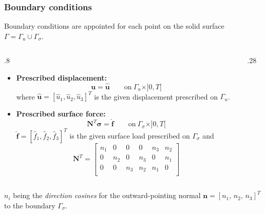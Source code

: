 \documentclass[aspectratio=169]{beamer}
\begin{document}
\begin{frame}
  \frametitle{Boundary conditions}
  \small Boundary conditions are appointed for each point on the solid surface $\Gamma=\Gamma_u\cup\Gamma_\sigma$.
  \vspace{-.2cm}
  \begin{columns}[T]
    \begin{column}{.8\textwidth}
      \small
      \begin{itemize}
        \item \textbf{Prescribed displacement:}
              $$\mathbf u=\mathbf{\hat u}\qquad \mbox{on}\  \Gamma_u\times]0,T[$$
              where $\mathbf{\hat u}=[\hat u_1, \hat u_2,\hat u_3]^T$ is the given displacement prescribed on $\Gamma_u$.
        \item \textbf{Prescribed surface force:}
              $$\mathbf N^T\boldsymbol\sigma= \mathbf{\hat f}\qquad \mbox{on}\  \Gamma_\sigma\times]0,T[$$
              $\mathbf{\hat f}=[\hat f_1,\hat f_2,\hat f_3]^T$ is the given surface load prescribed on $\Gamma_\sigma$ and
              $$\mathbf N^T=\begin{bmatrix}n_1 & 0 & 0 & 0 & n_3 & n_2\\ 0 & n_2 & 0 & n_3 & 0 & n_1\\  0 & 0 & n_3 & n_2 & n_1 & 0\\  \end{bmatrix}$$
      \end{itemize}

    \end{column}
    \hfill
    \begin{column}{.28\textwidth}
      \begin{center}
      \end{center}
    \end{column}
  \end{columns}
  \vspace{.2cm}
  \small $n_{i}$ being the \emph{direction cosines} for the outward-pointing normal $\mathbf n=[n_{1},\, n_{2},\, n_{3}]^T$ to the boundary $\Gamma_{\sigma}$.
\end{frame}
\end{document}
